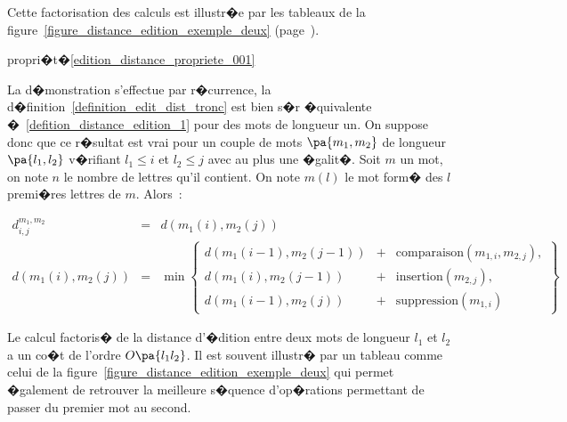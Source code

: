 Cette factorisation des calculs est illustr�e par les tableaux de la figure~\ref{figure_distance_edition_exemple_deux}
(page~\pageref{figure_distance_edition_exemple_deux}).



\begin{xdemo}{propri�t�}{\ref{edition_distance_propriete_001}}

La d�monstration s'effectue par r�currence, la d�finition~\ref{definition_edit_dist_tronc} est bien s�r �quivalente �~\ref{defition_distance_edition_1} pour des mots de longueur un. On suppose donc que ce r�sultat est vrai pour un couple de mots $\pa{m_1,m_2}$ de longueur $\pa{l_1,l_2}$ v�rifiant $l_1 \leqslant i$ et $l_2 \leqslant j$ avec au plus une �galit�. Soit $m$ un mot, on note $n$ le nombre de lettres qu'il contient. On note  $m\left(  l\right)  $ le mot form� des $l$ premi�res lettres de $m$. Alors~:

    \begin{eqnarray*}
    d_{i,j}^{m_{1},m_{2}} &=& d\left(  m_{1}\left( i\right) ,m_{2}\left( j\right)  \right)\\
    d\left(  m_{1}\left(  i\right)  ,m_{2}\left( j\right) \right)  &=&
        \min\left\{
                \begin{array}{lll}%
                d\left(  m_{1}\left(  i-1\right)  ,m_{2}\left(  j-1\right)  \right)
                		&	+	& \text{comparaison}\left(  m_{1,i},m_{2,j}\right), \\
                d\left(  m_{1}\left(  i\right)  ,m_{2}\left(  j-1\right)  \right)
                		&	+	& \text{insertion}\left(  m_{2,j}\right), \\
                d\left(  m_{1}\left(  i-1\right)  ,m_{2}\left(  j\right)  \right) 
                		&	+	& \text{suppression}\left(  m_{1,i}\right)
                \end{array}
            \right\}
    \end{eqnarray*}

\end{xdemo}

Le calcul factoris� de la distance d'�dition entre deux mots de longueur $l_1$ et $l_2$ a un co�t de l'ordre $O\pa{l_1 l_2}$. Il est souvent illustr� par un tableau comme celui de la figure~\ref{figure_distance_edition_exemple_deux} qui permet �galement de retrouver la meilleure s�quence d'op�rations permettant de passer du premier mot au second.




